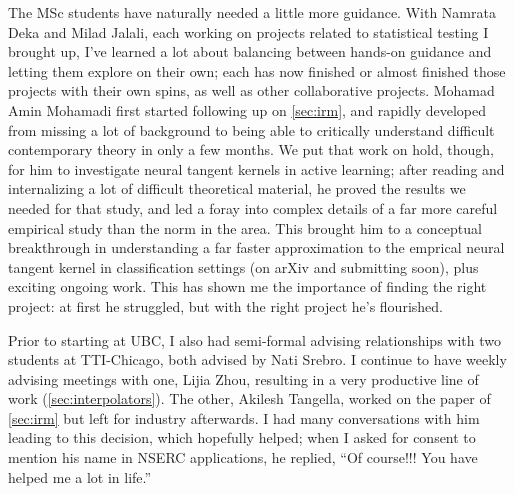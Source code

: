 \documentclass[12pt]{article}
\begin{document}
The MSc students have naturally needed a little more guidance.
With Namrata Deka and Milad Jalali, each working on projects related to statistical testing I brought up,
I've learned a lot about balancing between hands-on guidance and letting them explore on their own;
each has now finished or almost finished those projects with their own spins,
as well as other collaborative projects.
Mohamad Amin Mohamadi first started following up on \cref{sec:irm},
and rapidly developed from missing a lot of background to being able to critically understand difficult contemporary theory in only a few months.
We put that work on hold, though, for him to investigate neural tangent kernels in active learning;
after reading and internalizing a lot of difficult theoretical material,
he proved the results we needed for that study,
and led a foray into complex details of a far more careful empirical study than the norm in the area.
This brought him to a conceptual breakthrough in understanding a far faster approximation to the emprical neural tangent kernel in classification settings (on arXiv and submitting soon), plus exciting ongoing work.
This has shown me the importance of finding the right project:
at first he struggled, but with the right project he's flourished.

Prior to starting at UBC,
I also had semi-formal advising relationships with two students at TTI-Chicago,
both advised by Nati Srebro. %
I continue to have weekly advising meetings with one, Lijia Zhou, resulting in a very productive line of work (\cref{sec:interpolators}).
The other,
Akilesh Tangella,
worked on the paper of \cref{sec:irm}
but left for industry afterwards.
I had many conversations with him leading to this decision, which hopefully helped;
when I asked for consent to mention his name in NSERC applications, he replied, ``Of course!!! You have helped me a lot in life.''
\end{document}
